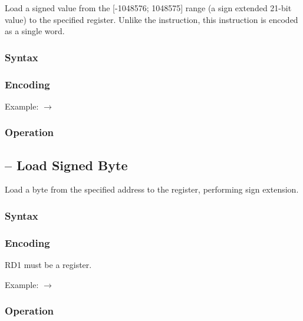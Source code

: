 \documentclass[a4paper,12pt,twoside,extrafontsizes]{memoir}
\begin{document}
{Load a signed value from the [-1048576; 1048575] range (a sign extended 21-bit value) to the specified register. Unlike the  instruction, this instruction is encoded as a single word.

\subsubsection{Syntax}


\subsubsection{Encoding}


Example:  $\rightarrow$ 

\subsubsection{Operation}


\subsection{ -- Load Signed Byte}
\label{subsec:instr:lsb}

Load a byte from the specified address to the register, performing sign extension.

\subsubsection{Syntax}


\subsubsection{Encoding}


RD1 must be a register.

Example:  $\rightarrow$ 

\subsubsection{Operation}

}
\end{document}
